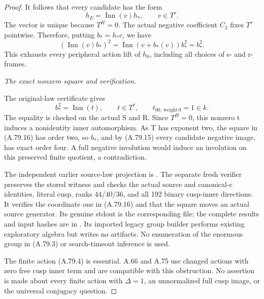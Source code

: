 \begin{proof}
It follows that every candidate has the form
\[
                  h_E=\operatorname{Inn}(v)h_*,
                  \qquad v\in T^\tau.
 \tag{A.79.14}
\]
The vector is unique because \(T^H=0\). The actual negative
coefficient \(C_3\) fixes \(T^\tau\) pointwise. Therefore,
putting \(b_*=h_*c\), we have
\[
 (\operatorname{Inn}(v)b_*)^2
       =\operatorname{Inn}(v+b_*(v))b_*^2=b_*^2.
 \tag{A.79.15}
\]
This exhausts every peripheral action lift of \(h_0\), including
all choices of s- and r-frames.

\emph{The exact nonzero square and verification.}\par
The original-law certificate
 gives
\[
 b_*^2=\operatorname{Inn}(t),\qquad
 t\in T^\tau,\qquad
                  t_{00,\,\mathrm{weight}\,0}=1\in k.
 \tag{A.79.16}
\]
The equality is checked on the actual S and R. Since \(T^H=0\),
this nonzero t induces a nonidentity inner automorphism.
As T has exponent two, the square in (A.79.16) has order two,
so \(b_*\), and by (A.79.15) every candidate negative image,
has exact order four. A full negative involution would induce
an involution on this preserved finite quotient, a contradiction.

The independent earlier source-law projection is
.
The separate fresh verifier
preserves the stored witness and checks the actual source and
canonical-c identities, literal cusp, ranks 44/40/36, and all 192
binary cusp-inner directions. It verifies the coordinate one
in (A.79.16) and that the square moves an actual source generator.
Its genuine stdout is the corresponding  file;
the complete results and input hashes are in
.
Its imported legacy group builder performs existing exploratory
algebra but writes no artifacts. No enumeration of the enormous
group in (A.79.3) or search-timeout inference is used.

The finite action (A.79.4) is essential. A.66 and A.75 use
changed actions with zero free cusp inner term and are compatible
with this obstruction. No assertion is made about every finite
action with \(\Delta=1\), an unnormalized full cusp image,
or the universal conjugacy question.
\end{proof}

